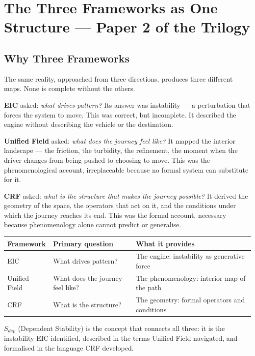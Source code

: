 \documentclass[12pt, a4paper]{article}
\begin{document}
\section{The Three Frameworks as One Structure --- Paper 2 of the Trilogy}
\label{sec:bridge}

\subsection*{Why Three Frameworks}

The same reality, approached from three directions, produces three different maps.
None is complete without the others.

\textbf{EIC} asked: \textit{what drives pattern?} Its answer was instability ---
a perturbation that forces the system to move. This was correct, but incomplete.
It described the engine without describing the vehicle or the destination.

\textbf{Unified Field} asked: \textit{what does the journey feel like?} It mapped
the interior landscape --- the friction, the turbidity, the refinement, the moment
when the driver changes from being pushed to choosing to move. This was the
phenomenological account, irreplaceable because no formal system can substitute
for it.

\textbf{CRF} asked: \textit{what is the structure that makes the journey possible?}
It derived the geometry of the space, the operators that act on it, and the
conditions under which the journey reaches its end. This was the formal account,
necessary because phenomenology alone cannot predict or generalise.

\begin{keybox}[title={The Three Frameworks as Complementary Descriptions}]
\begin{center}
\renewcommand{\arraystretch}{1.4}
\begin{tabular}{p{2.5cm} p{4.5cm} p{4.5cm}}
\toprule
\textbf{Framework} & \textbf{Primary question} & \textbf{What it provides} \\
\midrule
EIC & What drives pattern? & The engine: instability as generative force \\
Unified Field & What does the journey feel like? & The phenomenology: interior map of the path \\
CRF & What is the structure? & The geometry: formal operators and conditions \\
\bottomrule
\end{tabular}
\end{center}

$S_{dep}$ (Dependent Stability) is the concept that connects all three:
it is the instability EIC identified, described in the terms Unified Field
navigated, and formalised in the language CRF developed.
\end{keybox}
\end{document}
